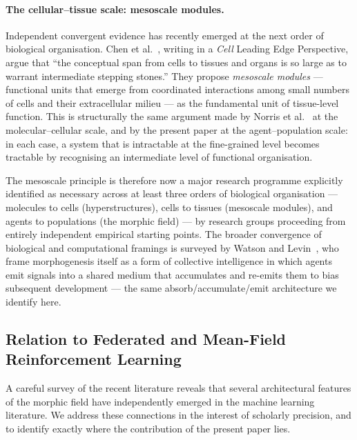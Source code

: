 \documentclass[twoside,11pt]{article}
\begin{document}
\paragraph{The cellular--tissue scale: mesoscale modules.}
Independent convergent evidence has recently emerged at the next order of
biological organisation.  Chen et al.~\citep{chen2025mesoscale}, writing in a
\textit{Cell} Leading Edge Perspective, argue that ``the conceptual span from
cells to tissues and organs is so large as to warrant intermediate stepping
stones.''  They propose \emph{mesoscale modules} --- functional units that
emerge from coordinated interactions among small numbers of cells and their
extracellular milieu --- as the fundamental unit of tissue-level function.
This is structurally the same argument made by Norris et al.~\citep{norris1999}
at the molecular--cellular scale, and by the present paper at the
agent--population scale: in each case, a system that is intractable at the
fine-grained level becomes tractable by recognising an intermediate level of
functional organisation.

The mesoscale principle is therefore now a major research programme explicitly
identified as necessary across at least three orders of biological organisation
--- molecules to cells (hyperstructures), cells to tissues (mesoscale modules),
and agents to populations (the morphic field) --- by research groups proceeding
from entirely independent empirical starting points.  The broader convergence
of biological and computational framings is surveyed by Watson and
Levin~\citep{watson2023collective}, who frame morphogenesis itself as a form of
collective intelligence in which agents emit signals into a shared medium that
accumulates and re-emits them to bias subsequent development --- the same
absorb/accumulate/emit architecture we identify here.

\subsection{Relation to Federated and Mean-Field Reinforcement Learning}
\label{sec:background:mfrl}

A careful survey of the recent literature reveals that several architectural
features of the morphic field have independently emerged in the machine
learning literature.  We address these connections in the interest of scholarly
precision, and to identify exactly where the contribution of the present paper
lies.
\end{document}
